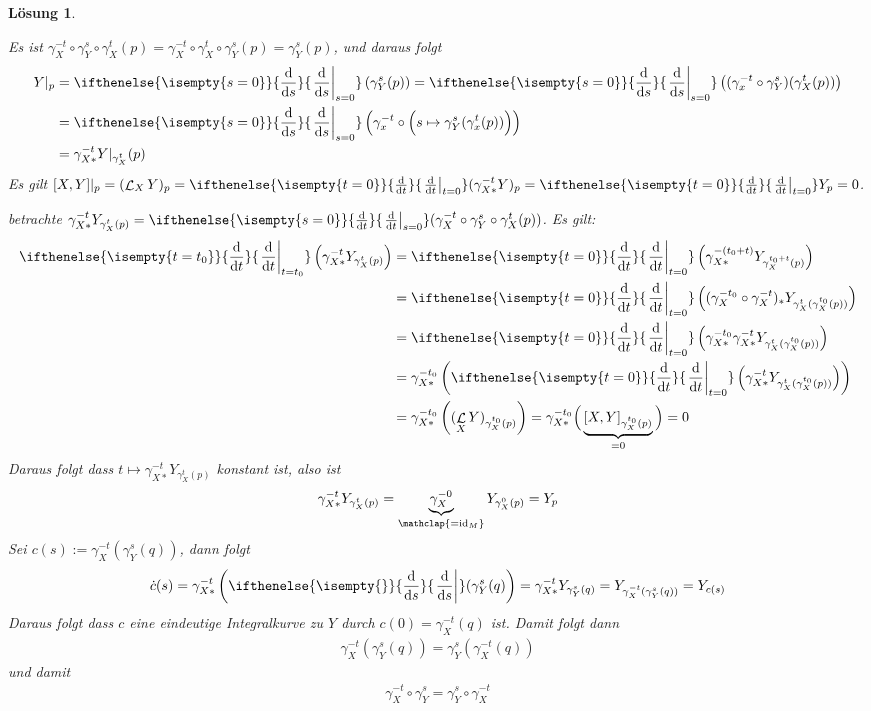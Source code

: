 \documentclass[paper=A4, twoside, chapterprefix=true, bibliography=totoc, headsepline]{scrbook}
\DeclareMathOperator{\calL}{\mathcal{L}}
\DeclareMathOperator{\id}{id}       %
\newcommand{\dop}{\mathrm{d}}
\newcommand{\difffrac}[3][]{\ifthenelse{\isempty{#1}}{\frac{\dop #2}{\dop #3}}{\left. \frac{\dop #2}{\dop #3} \right|_{#1}}}
\theoremstyle{plain}
\theoremstyle{nonumberplain}
\theoremstyle{empty}
\theoremstyle{break}
\newtheorem{Loes}{L\"osung}
\begin{document}
\begin{Loes}
\begin{description}[leftmargin=*]
\item[(ii) $\bm{\Rightarrow}$ (i):]
	Es ist $\gamma_X^{-t} \circ \gamma_Y^s \circ \gamma_X^t (p) = \gamma_X^{-t} \circ \gamma_X^t \circ \gamma_Y^s (p) = \gamma_Y^s (p)$, und daraus folgt
	\begin{align*}
		Y|_p &= \difffrac[s=0]{}{s} \left( \gamma_Y^s(p) \right) = \difffrac[s=0]{}{s} \left( (\gamma_x^{-t} \circ \gamma_Y^s) (\gamma_X^t (p) ) \right) \\
		&= \difffrac[s=0]{}{s} \left( \gamma_x^{-t} \circ \Big( s \mapsto \gamma_Y^s (\gamma_x^t (p)) \Big) \right) \\
		&= \gamma_{X*}^{-t} Y|_{\gamma_X^t} (p)
	\end{align*}
	Es gilt $[X,Y]|_p = (\calL_X Y)_p = \difffrac[t=0]{}{t} (\gamma_{X*}^{-t} Y)_p = \difffrac[t=0]{}{t} Y_p = 0$.
\item[(i) $\bm{\Rightarrow}$ (ii):]
	betrachte $\gamma_{X*}^{-t} Y_{\gamma_{X}^{t}(p)} = \difffrac[s=0]{}{t} (\gamma_X^{-t} \circ \gamma_Y^s \circ \gamma_X^t (p))$. Es gilt:
	\begin{align*}
		\difffrac[t=t_0]{}{t} \left( \gamma_{X*}^{-t} Y_{\gamma_X^t(p)} \right) &= \difffrac[t=0]{}{t} \left( \gamma_{X*}^{-(t_0 + t)} Y_{\gamma_X^{t_0+t}(p)} \right) \\
		&= \difffrac[t=0]{}{t} \left( (\gamma_X^{-t_0} \circ \gamma_X^{-t})_* Y_{\gamma_X^t(\gamma_X^{t_0}(p))} \right) \\
		&= \difffrac[t=0]{}{t} \left( \gamma_{X*}^{-t_0} \gamma_{X*}^{-t} Y_{\gamma_X^t(\gamma_X^{t_0}(p))} \right) \\
		&= \gamma_{X*}^{-t_0} \left( \difffrac[t=0]{}{t} \left( \gamma_{X*}^{-t} Y_{\gamma_X^t(\gamma_X^{t_0}(p))} \right) \right) \\
		&= \gamma_{X*}^{-t_0} \left( (\calL_X Y)_{\gamma_X^{t_0}(p)} \right) = \gamma_{X*}^{-t_0} \Big( \underbrace{[X,Y]_{\gamma_X^{t_0}(p)}}_{=0} \Big) = 0
	\end{align*}
	Daraus folgt dass $t \mapsto \gamma_{X*}^{-t} Y_{\gamma_X^t(p)}$ konstant ist, also ist
	\begin{align*}
		\gamma_{X*}^{-t} Y_{\gamma_X^t(p)} = \underbrace{\gamma_X^{-0}}_{\mathclap{=\id_M}} Y_{\gamma_X^0(p)} = Y_p
	\end{align*}
	Sei $c(s) := \gamma_X^{-t}(\gamma_Y^s(q))$, dann folgt
	\begin{align*}
		\dot{c}(s) = \gamma_{X*}^{-t} \left( \difffrac{}{s} (\gamma_Y^s(q) \right) 
		= \gamma_{X*}^{-t} Y_{\gamma_{Y}^{s}(q)} = Y_{\gamma_{X}^{-t}(\gamma_Y^s(q))} = Y_{c(s)}
	\end{align*}
	Daraus folgt dass $c$ eine eindeutige Integralkurve zu $Y$ durch $c(0) = \gamma_X^{-t}(q)$ ist. Damit folgt dann
	\begin{align*}
		\gamma_X^{-t}(\gamma_Y^s(q)) = \gamma_Y^s(\gamma_X^{-t}(q))
	\end{align*}
	und damit
	\begin{align*}
		\gamma_X^{-t} \circ \gamma_Y^s = \gamma_Y^s \circ \gamma_X^{-t}
	\end{align*}
\end{description}
\end{Loes}
\end{document}
